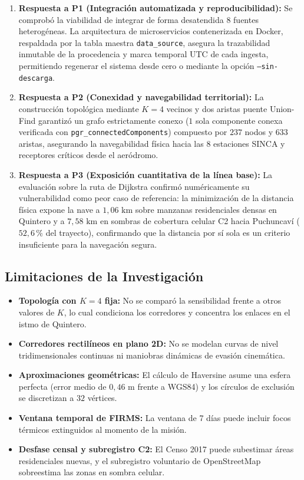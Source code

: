 \documentclass[letterpaper,12pt]{article}
\begin{document}
\begin{enumerate}
    \item \textbf{Respuesta a P1 (Integración automatizada y reproducibilidad):} Se comprobó la viabilidad de integrar de forma desatendida $8$ fuentes heterogéneas. La arquitectura de microservicios contenerizada en Docker, respaldada por la tabla maestra \texttt{data\_source}, asegura la trazabilidad inmutable de la procedencia y marca temporal UTC de cada ingesta, permitiendo regenerar el sistema desde cero o mediante la opción \texttt{--sin-descarga}.
    \item \textbf{Respuesta a P2 (Conexidad y navegabilidad territorial):} La construcción topológica mediante $K=4$ vecinos y dos aristas puente Union-Find garantizó un grafo estrictamente conexo ($1$ sola componente conexa verificada con \texttt{pgr\_connectedComponents}) compuesto por $237$ nodos y $633$ aristas, asegurando la navegabilidad física hacia las $8$ estaciones SINCA y receptores críticos desde el aeródromo.
    \item \textbf{Respuesta a P3 (Exposición cuantitativa de la línea base):} La evaluación sobre la ruta de Dijkstra confirmó numéricamente su vulnerabilidad como peor caso de referencia: la minimización de la distancia física expone la nave a $1{,}06\text{ km}$ sobre manzanas residenciales densas en Quintero y a $7{,}58\text{ km}$ en sombras de cobertura celular C2 hacia Puchuncaví ($52{,}6$\,\% del trayecto), confirmando que la distancia por sí sola es un criterio insuficiente para la navegación segura.
\end{enumerate}

\subsection{Limitaciones de la Investigación}
\label{subsec:limitaciones_investigacion}

\begin{itemize}
    \item \textbf{Topología con $K=4$ fija:} No se comparó la sensibilidad frente a otros valores de $K$, lo cual condiciona los corredores y concentra los enlaces en el istmo de Quintero.
    \item \textbf{Corredores rectilíneos en plano 2D:} No se modelan curvas de nivel tridimensionales continuas ni maniobras dinámicas de evasión cinemática.
    \item \textbf{Aproximaciones geométricas:} El cálculo de Haversine asume una esfera perfecta (error medio de $0{,}46\text{ m}$ frente a WGS84) y los círculos de exclusión se discretizan a $32$ vértices.
    \item \textbf{Ventana temporal de FIRMS:} La ventana de 7 días puede incluir focos térmicos extinguidos al momento de la misión.
    \item \textbf{Desfase censal y subregistro C2:} El Censo 2017 puede subestimar áreas residenciales nuevas, y el subregistro voluntario de OpenStreetMap sobreestima las zonas en sombra celular.
\end{itemize}
\end{document}
